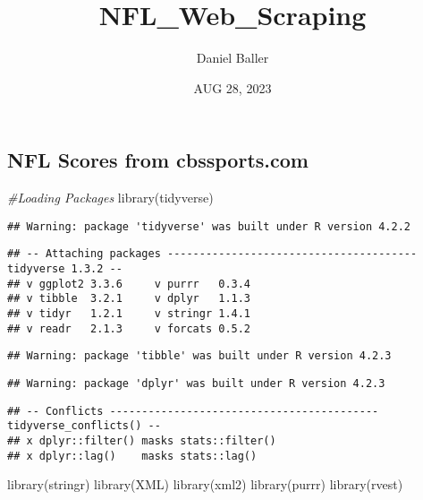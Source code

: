 \documentclass[
]{article}
\title{NFL\_Web\_Scraping}
\author{Daniel Baller}
\date{AUG 28, 2023}
\newenvironment{Shaded}{\begin{snugshade}}{\end{snugshade}}
\newcommand{\CommentTok}[1]{\textcolor[rgb]{0.56,0.35,0.01}{\textit{#1}}}
\newcommand{\FunctionTok}[1]{\textcolor[rgb]{0.00,0.00,0.00}{#1}}
\newcommand{\NormalTok}[1]{#1}
\begin{document}
\maketitle

\hypertarget{nfl-scores-from-cbssports.com}{%
\subsection{NFL Scores from
cbssports.com}\label{nfl-scores-from-cbssports.com}}

\begin{Shaded}
\begin{Highlighting}[]
\CommentTok{\#Loading Packages}
\FunctionTok{library}\NormalTok{(tidyverse)}
\end{Highlighting}
\end{Shaded}

\begin{verbatim}
## Warning: package 'tidyverse' was built under R version 4.2.2
\end{verbatim}

\begin{verbatim}
## -- Attaching packages --------------------------------------- tidyverse 1.3.2 --
## v ggplot2 3.3.6     v purrr   0.3.4
## v tibble  3.2.1     v dplyr   1.1.3
## v tidyr   1.2.1     v stringr 1.4.1
## v readr   2.1.3     v forcats 0.5.2
\end{verbatim}

\begin{verbatim}
## Warning: package 'tibble' was built under R version 4.2.3
\end{verbatim}

\begin{verbatim}
## Warning: package 'dplyr' was built under R version 4.2.3
\end{verbatim}

\begin{verbatim}
## -- Conflicts ------------------------------------------ tidyverse_conflicts() --
## x dplyr::filter() masks stats::filter()
## x dplyr::lag()    masks stats::lag()
\end{verbatim}

\begin{Shaded}
\begin{Highlighting}[]
\FunctionTok{library}\NormalTok{(stringr)}
\FunctionTok{library}\NormalTok{(XML)}
\FunctionTok{library}\NormalTok{(xml2)}
\FunctionTok{library}\NormalTok{(purrr)}
\FunctionTok{library}\NormalTok{(rvest)}
\end{Highlighting}
\end{Shaded}
\end{document}

